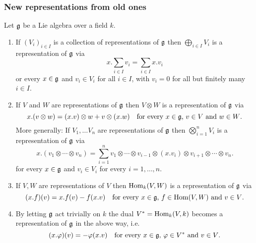 \subsubsection{New representations from old ones}


\begin{prop}
 Let $\mathfrak{g}$ be a Lie algebra over a field $k$.
 \begin{enumerate}[leftmargin=*]
  \item
   If $(V_i)_{i \in I}$ is a collection of representations of $\mathfrak{g}$ then $\bigoplus_{i \in I} V_i$ is a representation of $\mathfrak{g}$ via
   \[
    x.\sum_{i \in I} v_i = \sum_{i \in I} x.v_i
   \]
   or every $x \in \mathfrak{g}$ and $v_i \in V_i$ for all $i \in I$, with $v_i = 0$ for all but finitely many $i \in I$.
  \item
   If $V$ and $W$ are representations of $\mathfrak{g}$ then $V \otimes W$ is a representation of $\mathfrak{g}$ via
   \[
    x.(v \otimes w) = (x.v) \otimes w + v \otimes (x.w) \quad \text{for every $x \in \mathfrak{g}$, $v \in V$ and $w \in W$}.
   \]
   More generally: If $V_1, \dotsc V_n$ are representations of $\mathfrak{g}$ then $\bigotimes_{i=1}^n V_i$ is a representation of $\mathfrak{g}$ via
   \[
    x.(v_1 \otimes \dotsb \otimes v_n)
    = \sum_{i=1}^n v_1 \otimes \dotsb \otimes v_{i-1} \otimes (x.v_i) \otimes v_{i+1} \otimes \dotsb \otimes v_n.
   \]
   for every $x \in \mathfrak{g}$ and $v_i \in V_i$ for every $i = 1, \dotsc, n$.
  \item
   If $V, W$ are representations of $V$ then $\operatorname{Hom}_k(V,W)$ is a representation of $\mathfrak{g}$ via
   \[
    (x.f)(v) = x.f(v) - f(x.v) \quad \text{for every $x \in \mathfrak{g}$, $f \in \operatorname{Hom}(V,W)$ and $v \in V$}.
   \]
  \item
   By letting $\mathfrak{g}$ act trivially on $k$ the dual $V^* = \operatorname{Hom}_k(V,k)$ becomes a representation of $\mathfrak{g}$ in the above way, i.e.
   \[
    (x.\varphi)(v) = -\varphi(x.v) \quad \text{for every $x \in \mathfrak{g}$, $\varphi \in V^*$ and $v \in V$}.
   \]
 \end{enumerate}
\end{prop}


